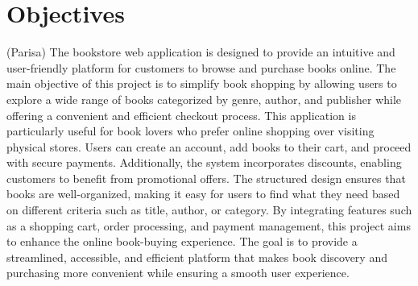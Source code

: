 \section{Objectives}


(Parisa)
The bookstore web application is designed to provide an intuitive and user-friendly platform for customers to browse and purchase books online. The main objective of this project is to simplify book shopping by allowing users to explore a wide range of books categorized by genre, author, and publisher while offering a convenient and efficient checkout process.
This application is particularly useful for book lovers who prefer online shopping over visiting physical stores. Users can create an account, add books to their cart, and proceed with secure payments. Additionally, the system incorporates discounts, enabling customers to benefit from promotional offers. The structured design ensures that books are well-organized, making it easy for users to find what they need based on different criteria such as title, author, or category.
By integrating features such as a shopping cart, order processing, and payment management, this project aims to enhance the online book-buying experience. The goal is to provide a streamlined, accessible, and efficient platform that makes book discovery and purchasing more convenient while ensuring a smooth user experience.